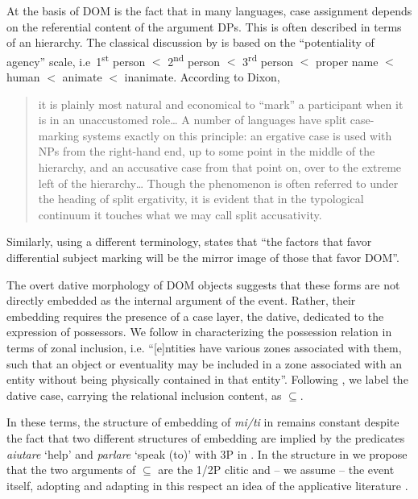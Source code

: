 \documentclass[output=paper]{langsci/langscibook}
\begin{document}
At the basis of \gls{DOM} is the fact that in many languages, case assignment depends
on the referential content of the argument DPs. This is often described in
terms of an  hierarchy. The classical discussion by
\citet[85--86]{Dixon1979} is based on the “potentiality of agency” scale, i.e\
1\textsuperscript{st} person $<$ 2\textsuperscript{nd} person $<$
3\textsuperscript{rd} person $<$ proper name $<$ human $<$ animate $<$ inanimate.
According to Dixon,

\begin{quote}
it is plainly most natural and economical to “mark” a
participant when it is in an unaccustomed role\dots{} A number of languages have
split case-marking systems exactly on this principle: an ergative case is used
with NPs from the right-hand end, up to some point in the middle of the
hierarchy, and an accusative\is{accusative case} case from that point on, over to the extreme left
of the hierarchy\dots{} Though the phenomenon is often referred to under the
heading of split ergativity, it is evident that in the typological continuum it
touches what we may call split accusativity.
\end{quote}

\noindent Similarly, using a different
terminology, \citet[473]{Aissen2003} states that “the factors that favor
differential subject marking will be the mirror image of those that favor DOM”.

The overt dative morphology of \gls{DOM} objects suggests that these forms are not
directly embedded as the internal argument of the event. Rather, their
embedding requires the presence of a case layer, the dative, dedicated to the
expression of possessors. We follow \citet[170]{BeldenDik1997} in
characterizing the possession relation in terms of zonal inclusion, i.e.
“[e]ntities have various zones associated with them, such that an object or
eventuality may be included in a zone associated with an entity without being
physically contained in that entity”. Following \citet{Manzini2012}, we label
the dative\is{dative case} case, carrying the relational inclusion content, as ${\subseteq}$.

In these terms, the structure of embedding of \emph{mi/ti} in 
remains constant despite the fact that two different structures of embedding
are implied by the predicates \emph{aiutare} ‘help’ and \emph{parlare} ‘speak
(to)’ with 3P \isi{clitics} in \REF{ex:06.1}. In the structure in  we
propose that the two arguments of ${\subseteq}$ are the 1/2P clitic and – we
assume – the event itself, adopting and adapting in this respect an idea of
the applicative literature \citep{Pylkkanen2008}.
\end{document}
